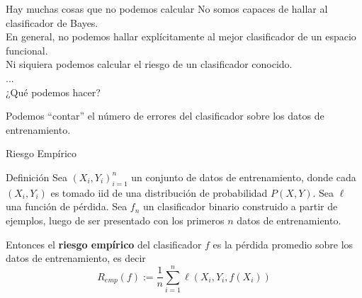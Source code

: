 \documentclass[aspectratio=169, 10pt]{beamer}
\begin{document}
\begin{frame}
  \Large
  \begin{alertblock}{Hay muchas cosas que no podemos calcular}
      No somos capaces de hallar al clasificador de Bayes.\\
      \pause
      En general, no podemos hallar explícitamente al mejor clasificador de un espacio funcional.\\
      \pause
      Ni siquiera podemos calcular el riesgo de un clasificador conocido.\\
      ...\\
      ¿Qué podemos hacer?
  \end{alertblock}
\pause
\bigskip
  Podemos “contar”  el número de errores del clasificador sobre los
datos de entrenamiento. \\

\end{frame}

\begin{frame}{Riesgo Empírico}
  \begin{block}{Definición}
    \large
    Sea $(X_i,Y_i)_{i=1}^n$ un conjunto de datos de entrenamiento, donde cada $(X_i,Y_i)$ es tomado iid de una distribución de probabilidad $P(X,Y)$. Sea
    $\ell$ una función de pérdida. Sea $f_n$ un clasificador binario construido a partir de ejemplos, luego
    de ser presentado con los primeros $n$ datos de entrenamiento.\\
\bigskip

    Entonces el \textbf{riesgo empírico} del clasificador $f$ es la pérdida promedio sobre los datos de entrenamiento, es decir
    \[
    R_{emp}(f) := \frac{1}{n} \sum_{i=1}^n \ell(X_i,Y_i,f(X_i))
    \]
\end{block}
\end{frame}



\end{document}
